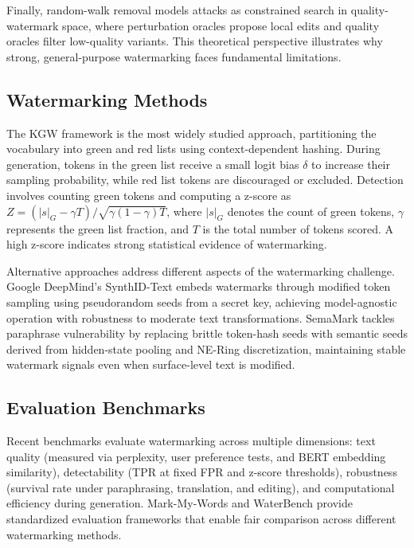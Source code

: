 \documentclass[12pt,letterpaper]{article}
\begin{document}
Finally, random-walk removal \cite{impossibility2023} models attacks as constrained search in quality-watermark space, where perturbation oracles propose local edits and quality oracles filter low-quality variants. This theoretical perspective illustrates why strong, general-purpose watermarking faces fundamental limitations.

\subsection{Watermarking Methods}

The KGW framework \cite{kirchenbauer2023} is the most widely studied approach, partitioning the vocabulary into green and red lists using context-dependent hashing. During generation, tokens in the green list receive a small logit bias $\delta$ to increase their sampling probability, while red list tokens are discouraged or excluded. Detection involves counting green tokens and computing a z-score as $Z = (|s|_G - \gamma T) / \sqrt{\gamma(1-\gamma)T}$, where $|s|_G$ denotes the count of green tokens, $\gamma$ represents the green list fraction, and $T$ is the total number of tokens scored. A high z-score indicates strong statistical evidence of watermarking.

Alternative approaches address different aspects of the watermarking challenge. Google DeepMind's SynthID-Text \cite{synthid2024} embeds watermarks through modified token sampling using pseudorandom seeds from a secret key, achieving model-agnostic operation with robustness to moderate text transformations. SemaMark \cite{semamark2023} tackles paraphrase vulnerability by replacing brittle token-hash seeds with semantic seeds derived from hidden-state pooling and NE-Ring discretization, maintaining stable watermark signals even when surface-level text is modified.

\subsection{Evaluation Benchmarks}

Recent benchmarks evaluate watermarking across multiple dimensions: text quality (measured via perplexity, user preference tests, and BERT embedding similarity), detectability (TPR at fixed FPR and z-score thresholds), robustness (survival rate under paraphrasing, translation, and editing), and computational efficiency during generation. Mark-My-Words \cite{piet2025} and WaterBench \cite{tu2023} provide standardized evaluation frameworks that enable fair comparison across different watermarking methods.
\end{document}
